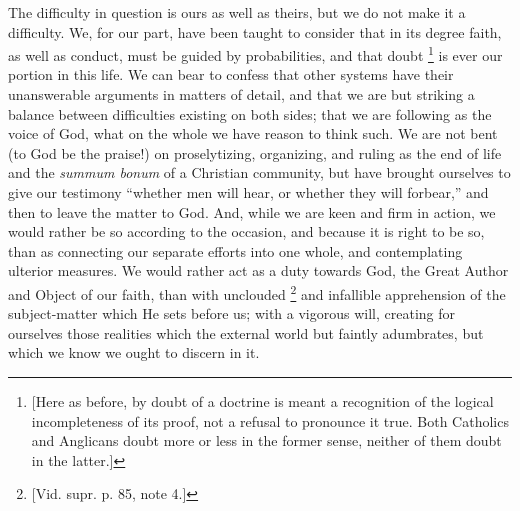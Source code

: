 The difficulty in question is ours as well as theirs, but we do not
make it a difficulty. We, for our part, have been taught to consider
that in its degree faith, as well as conduct, must be guided by
probabilities, and that doubt \footnote{[Here as before, by doubt of a doctrine is
meant a recognition of the logical incompleteness of its proof, not a
refusal to pronounce it true. Both Catholics and Anglicans doubt more
or less in the former sense, neither of them doubt in the latter.]}
is ever our portion in this life. We can bear to confess that other
systems have their unanswerable arguments in matters of detail, and
that we are but striking a balance between difficulties existing
on both sides; that we are following as the voice of God, what on the
whole we have reason to think such. We are not bent (to God be the
praise!) on proselytizing, organizing, and ruling as the end of life
and the \emph{summum bonum} of a Christian community, but have brought
ourselves to give our testimony ``whether men will hear, or
whether they will forbear,'' and then to leave the matter to God.
And, while we are keen and firm in action, we would rather be so
according to the occasion, and because it is right to be so, than as
connecting our separate efforts into one whole, and contemplating
ulterior measures. We would rather act as a duty towards God, the
Great Author and Object of our faith, than with unclouded \footnote{[Vid. supr. p. 85, note
4.]} and infallible apprehension of the subject-matter which He sets
before us; with a vigorous will, creating for ourselves those
realities which the external world but faintly adumbrates, but which
we know we ought to discern in it.

